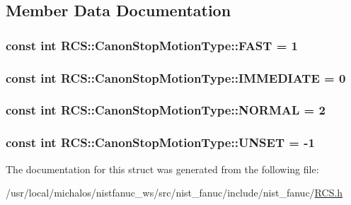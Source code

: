 \subsection{Member Data Documentation}
\hypertarget{structRCS_1_1CanonStopMotionType_a5f80c189b92160d7fd4a7f18d42e219e}{
\subsubsection[{F\-A\-S\-T}]{\setlength{\rightskip}{0pt plus 5cm}const int R\-C\-S\-::\-Canon\-Stop\-Motion\-Type\-::\-F\-A\-S\-T = 1\hspace{0.3cm}{\ttfamily [static]}}}\label{structRCS_1_1CanonStopMotionType_a5f80c189b92160d7fd4a7f18d42e219e}
\hypertarget{structRCS_1_1CanonStopMotionType_aece9aa30f3fc2a0fe4c612fb2063b074}{
\subsubsection[{I\-M\-M\-E\-D\-I\-A\-T\-E}]{\setlength{\rightskip}{0pt plus 5cm}const int R\-C\-S\-::\-Canon\-Stop\-Motion\-Type\-::\-I\-M\-M\-E\-D\-I\-A\-T\-E = 0\hspace{0.3cm}{\ttfamily [static]}}}\label{structRCS_1_1CanonStopMotionType_aece9aa30f3fc2a0fe4c612fb2063b074}
\hypertarget{structRCS_1_1CanonStopMotionType_a2b000079fed7d5f8f1cc88e5a5cba989}{
\subsubsection[{N\-O\-R\-M\-A\-L}]{\setlength{\rightskip}{0pt plus 5cm}const int R\-C\-S\-::\-Canon\-Stop\-Motion\-Type\-::\-N\-O\-R\-M\-A\-L = 2\hspace{0.3cm}{\ttfamily [static]}}}\label{structRCS_1_1CanonStopMotionType_a2b000079fed7d5f8f1cc88e5a5cba989}
\hypertarget{structRCS_1_1CanonStopMotionType_ac195165fc047fc240c3b68db2491da1e}{
\subsubsection[{U\-N\-S\-E\-T}]{\setlength{\rightskip}{0pt plus 5cm}const int R\-C\-S\-::\-Canon\-Stop\-Motion\-Type\-::\-U\-N\-S\-E\-T = -\/1\hspace{0.3cm}{\ttfamily [static]}}}\label{structRCS_1_1CanonStopMotionType_ac195165fc047fc240c3b68db2491da1e}


The documentation for this struct was generated from the following file\-:\begin{DoxyCompactItemize}
\item 
/usr/local/michalos/nistfanuc\-\_\-ws/src/nist\-\_\-fanuc/include/nist\-\_\-fanuc/\hyperlink{RCS_8h}{R\-C\-S.\-h}\end{DoxyCompactItemize}
